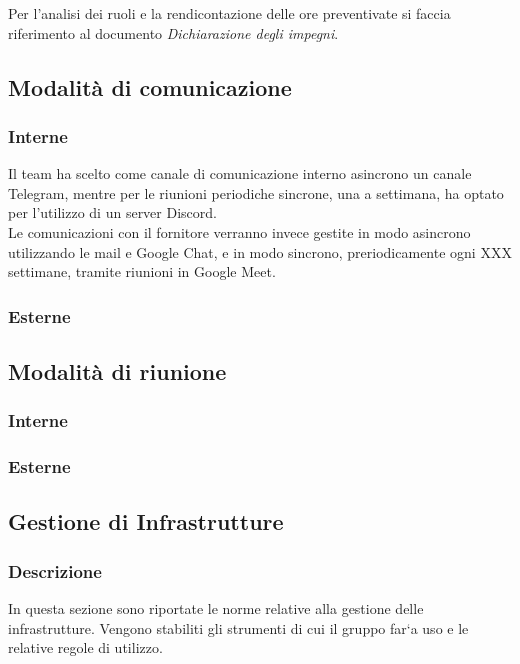             Per l'analisi dei ruoli e la rendicontazione delle ore preventivate si faccia riferimento al documento \textit{Dichiarazione degli impegni}.

    \subsection{Modalità di comunicazione}
        \subsubsection{Interne}
        Il team ha scelto come canale di comunicazione interno asincrono un canale Telegram,
        mentre per le riunioni periodiche sincrone, una a settimana, ha optato per 
        l'utilizzo di un server Discord.\\
        Le comunicazioni con il fornitore verranno invece gestite in modo asincrono 
        utilizzando le mail e Google Chat, e in modo sincrono, preriodicamente ogni 
        XXX settimane, tramite riunioni in Google Meet.
        \subsubsection{Esterne}

    \subsection{Modalità di riunione}
        \subsubsection{Interne}
        \subsubsection{Esterne}

    \subsection{Gestione di Infrastrutture}
        \subsubsection{Descrizione}
        In questa sezione sono riportate le norme relative alla gestione delle infrastrutture. Vengono stabiliti gli
        strumenti di cui il gruppo far`a uso e le relative regole di utilizzo.
